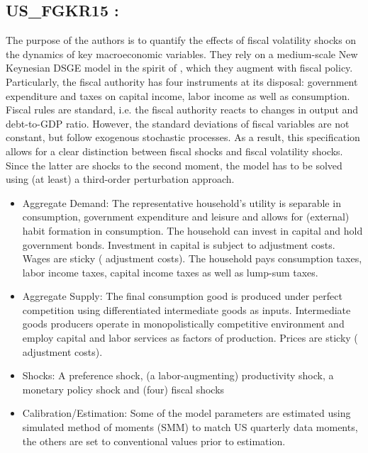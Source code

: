 \documentclass[11pt,a4paper]{article}
\begin{document}
	\subsection{US\_FGKR15 : \cite{FernandezVillaverdeetal2015}}
	\label{USFGKR15}
	The purpose of the authors is to quantify the effects of fiscal volatility shocks on the dynamics of key macroeconomic variables. They rely on a medium-scale New Keynesian DSGE model in the spirit of \cite{ChristianoEichenbaumEvans2005}, which they augment with fiscal policy. Particularly, the fiscal authority has four instruments at its disposal: government expenditure and taxes on capital income, labor income as well as consumption. Fiscal rules are standard, i.e. the fiscal authority reacts to changes in output and debt-to-GDP ratio. However, the standard deviations of fiscal variables are not constant, but follow exogenous stochastic processes. As a result, this specification allows for a clear distinction between fiscal shocks and fiscal volatility shocks. Since the latter are shocks to the second moment, the model has to be solved using (at least) a third-order perturbation approach. %
	\begin{itemize}
		\item Aggregate Demand: The representative household's utility is separable in consumption, government expenditure and leisure and allows for (external) habit formation in consumption. The household can invest in capital and hold government bonds. Investment in capital is subject to adjustment costs. Wages are sticky (\cite{Rotemberg1982} adjustment costs). The household pays consumption taxes, labor income taxes, capital income taxes as well as lump-sum taxes. 
		\item	Aggregate Supply: The final consumption good is produced under perfect competition using differentiated intermediate goods as inputs. Intermediate goods producers operate in monopolistically competitive environment and employ capital and labor services as factors of production. Prices are sticky (\cite{Rotemberg1982} adjustment costs).
		\item Shocks: A preference shock, (a labor-augmenting) productivity shock, a monetary policy shock and (four) fiscal shocks
		\item 	Calibration/Estimation: Some of the model parameters are estimated using simulated method of moments (SMM) to match US quarterly data moments, the others are set to conventional values prior to estimation.
	\end{itemize}
	
\end{document}
